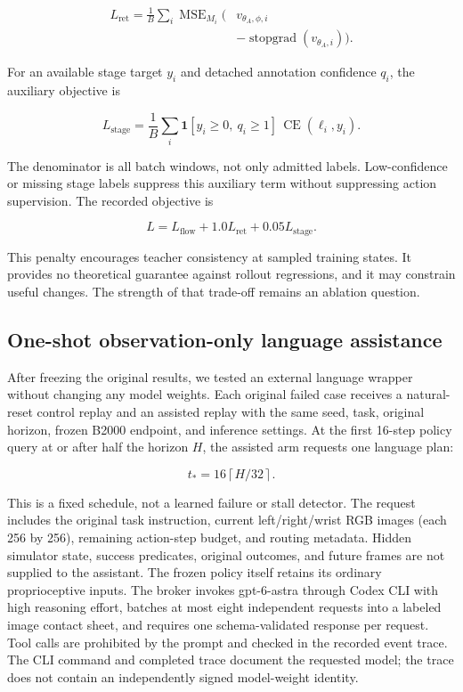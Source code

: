 \documentclass[10pt,twocolumn,letterpaper]{article}
\begin{document}
\begin{equation}\begin{aligned} L_{\mathrm{ret}}=\frac1B\sum_i\operatorname{MSE}_{M_i}\big(&v_{\theta_A,\phi,i}\\&-\operatorname{stopgrad}(v_{\theta_A,i})\big).\end{aligned}\end{equation}

For an available stage target $y_i$ and detached annotation confidence $q_i$, the auxiliary objective is


\begin{equation}L_{\mathrm{stage}}=\frac1B\sum_i\mathbf1[y_i\ge0,\ q_i\ge1]\,\operatorname{CE}(\ell_i,y_i).\end{equation}

The denominator is all batch windows, not only admitted labels. Low-confidence or missing stage labels suppress this auxiliary term without suppressing action supervision. The recorded objective is


\begin{equation}L=L_{\mathrm{flow}}+1.0L_{\mathrm{ret}}+0.05L_{\mathrm{stage}}.\end{equation}

This penalty encourages teacher consistency at sampled training states. It provides no theoretical guarantee against rollout regressions, and it may constrain useful changes. The strength of that trade-off remains an ablation question.


\subsection{One-shot observation-only language assistance}

After freezing the original results, we tested an external language wrapper without changing any model weights. Each original failed case receives a natural-reset control replay and an assisted replay with the same seed, task, original horizon, frozen B2000 endpoint, and inference settings. At the first 16-step policy query at or after half the horizon $H$, the assisted arm requests one language plan:


\begin{equation}t_*=16\left\lceil H/32\right\rceil.\end{equation}

This is a fixed schedule, not a learned failure or stall detector. The request includes the original task instruction, current left/right/wrist RGB images (each 256 by 256), remaining action-step budget, and routing metadata. Hidden simulator state, success predicates, original outcomes, and future frames are not supplied to the assistant. The frozen policy itself retains its ordinary proprioceptive inputs. The broker invokes gpt-6-astra through Codex CLI with high reasoning effort, batches at most eight independent requests into a labeled image contact sheet, and requires one schema-validated response per request. Tool calls are prohibited by the prompt and checked in the recorded event trace. The CLI command and completed trace document the requested model; the trace does not contain an independently signed model-weight identity.
\end{document}
